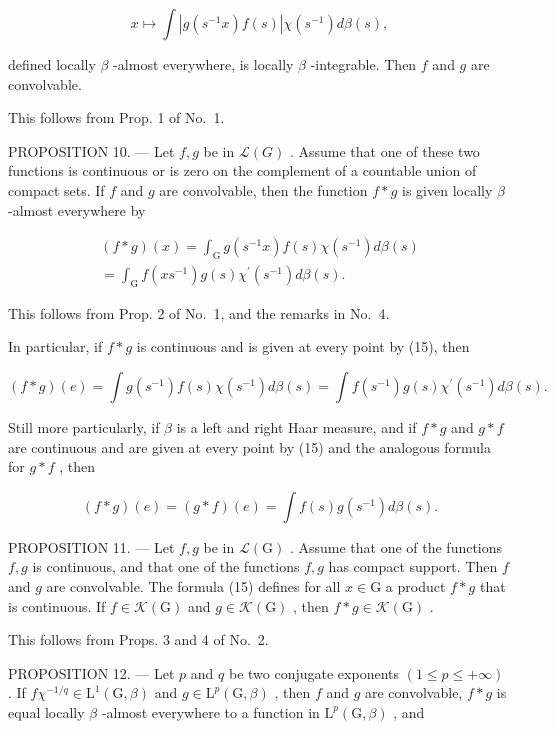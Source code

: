 \[
x \mapsto \int | g (s ^ {- 1} x) f (s) | \chi (s ^ {- 1}) d \beta (s),
\]

defined locally \(\beta\) -almost everywhere, is locally \(\beta\) -integrable. Then \(f\) and \(g\) are convolvable.

This follows from Prop. 1 of No.~1.

PROPOSITION 10. --- Let \(f, g\) be in \(\mathcal{L}(G)\) . Assume that one of these two functions is continuous or is zero on the complement of a countable union of compact sets. If \(f\) and \(g\) are convolvable, then the function \(f * g\) is given locally \(\beta\) -almost everywhere by

\[
\begin{array}{c} (f * g) (x) = \int_ {\mathrm{G}} g (s ^ {- 1} x) f (s) \chi (s ^ {- 1}) d \beta (s) \\ = \int_ {\mathrm{G}} f (x s ^ {- 1}) g (s) \chi^ {\prime} (s ^ {- 1}) d \beta (s). \end{array}\tag{15}
\]

This follows from Prop. 2 of No.~1, and the remarks in No.~4.

In particular, if \(f * g\) is continuous and is given at every point by (15), then

\[
(f * g) (e) = \int g (s ^ {- 1}) f (s) \chi (s ^ {- 1}) d \beta (s) = \int f (s ^ {- 1}) g (s) \chi^ {\prime} (s ^ {- 1}) d \beta (s).\tag{16}
\]

Still more particularly, if \(\beta\) is a left and right Haar measure, and if \(f*g\) and \(g*f\) are continuous and are given at every point by (15) and the analogous formula for \(g*f\) , then

\[
(f * g) (e) = (g * f) (e) = \int f (s) g (s ^ {- 1}) d \beta (s).\tag{17}
\]

PROPOSITION 11. --- Let \(f,g\) be in \(\mathcal{L}(\mathrm{G})\) . Assume that one of the functions \(f,g\) is continuous, and that one of the functions \(f,g\) has compact support. Then \(f\) and \(g\) are convolvable. The formula (15) defines for all \(x\in\mathrm{G}\) a product \(f*g\) that is continuous. If \(f\in\mathcal{K}(\mathrm{G})\) and \(g\in\mathcal{K}(\mathrm{G})\) , then \(f*g\in\mathcal{K}(\mathrm{G})\) .

This follows from Props. 3 and 4 of No.~2.

PROPOSITION 12. --- Let \(p\) and \(q\) be two conjugate exponents \((1 \leqslant p \leqslant +\infty)\) . If \(f\chi^{-1/q} \in \mathrm{L}^1(\mathrm{G}, \beta)\) and \(g \in \mathrm{L}^p(\mathrm{G}, \beta)\) , then \(f\) and \(g\) are convolvable, \(f * g\) is equal locally \(\beta\) -almost everywhere to a function in \(\mathrm{L}^p(\mathrm{G}, \beta)\) , and

